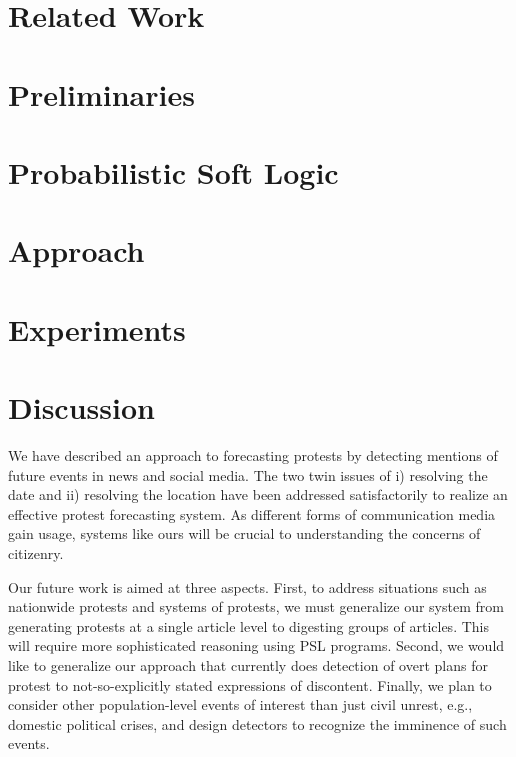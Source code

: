 \documentclass[10pt]{report}
\begin{document}
%
\chapter{Related Work}


\chapter{Preliminaries}


\chapter{Probabilistic Soft Logic}

\label{section:PSL}

\chapter{Approach}


\chapter{Experiments}


\chapter{Discussion}
We have described an approach to forecasting protests by detecting mentions of future events in news and social
media. The two twin issues of i) resolving the date and ii) resolving the location have been addressed satisfactorily
to realize an effective protest forecasting system. As different forms of communication media gain usage, systems
like ours will be crucial to understanding the concerns of citizenry.

Our future work is aimed at three aspects. First, to address situations such as nationwide protests and systems of protests,
we must generalize our system from generating protests at a single article level to digesting groups of articles. This will
require more sophisticated reasoning using PSL programs. 
Second, we would like to generalize our approach that currently
does detection of overt plans for protest to not-so-explicitly stated expressions of discontent. 
Finally, we plan to consider other population-level events of interest than just civil unrest, e.g., domestic political crises,
and design detectors to recognize the imminence of such events.




\cleardoublepage
{}


\end{document}
